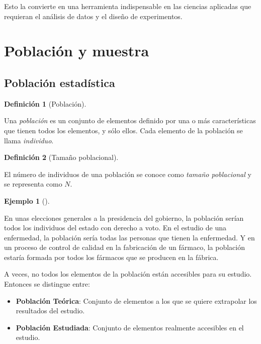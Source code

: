 \documentclass[
  spanish,
  a4paper,
]{scrreport}
\providecommand{\tightlist}{%
  \setlength{\itemsep}{0pt}\setlength{\parskip}{0pt}}
\theoremstyle{plain}
\theoremstyle{definition}
\newtheorem{example}{Ejemplo}[chapter]
\theoremstyle{definition}
\newtheorem{definition}{Definición}[chapter]
\theoremstyle{remark}
\begin{document}
Esto la convierte en una herramienta indispensable en las ciencias
aplicadas que requieran el análisis de datos y el diseño de
experimentos.

\section{Población y muestra}\label{poblaciuxf3n-y-muestra}

\subsection{Población estadística}\label{poblaciuxf3n-estaduxedstica}

\begin{definition}[Población]\protect\hypertarget{def-poblacion}{}\label{def-poblacion}

Una \emph{población} es un conjunto de elementos definido por una o más
características que tienen todos los elementos, y sólo ellos. Cada
elemento de la población se llama \emph{individuo}.

\end{definition}

\begin{definition}[Tamaño
poblacional]\protect\hypertarget{def-tamaño-poblacional}{}\label{def-tamaño-poblacional}

El número de individuos de una población se conoce como \emph{tamaño
poblacional} y se representa como \(N\).

\end{definition}

\begin{example}[]\protect\hypertarget{exm-tamaño-poblacional}{}\label{exm-tamaño-poblacional}

En unas elecciones generales a la presidencia del gobierno, la población
serían todos los individuos del estado con derecho a voto. En el estudio
de una enfermedad, la población sería todas las personas que tienen la
enfermedad. Y en un proceso de control de calidad en la fabricación de
un fármaco, la población estaría formada por todos los fármacos que se
producen en la fábrica.

\end{example}

A veces, no todos los elementos de la población están accesibles para su
estudio. Entonces se distingue entre:

\begin{itemize}
\tightlist
\item
  \textbf{Población Teórica}: Conjunto de elementos a los que se quiere
  extrapolar los resultados del estudio.
\item
  \textbf{Población Estudiada}: Conjunto de elementos realmente
  accesibles en el estudio.
\end{itemize}
\end{document}
